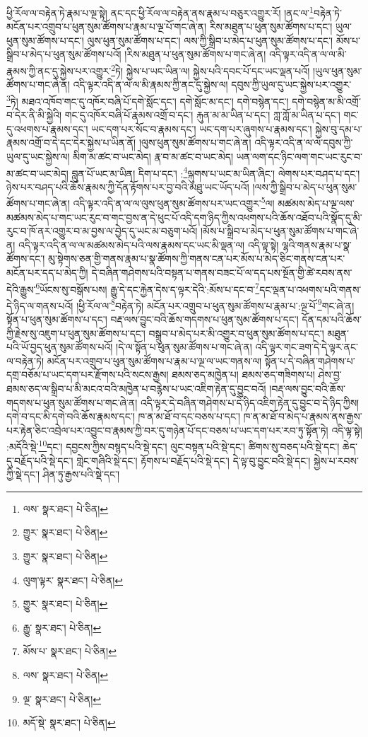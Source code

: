 ཕྱི་རོལ་ལ་བརྟེན་ཏེ་རྣམ་པ་ལྔ་སྟེ། ནང་དང་ཕྱི་རོལ་ལ་བརྟེན་ནས་རྣམ་པ་བཅུར་འགྱུར་རོ། །ནང་ལ་\footnote{ལས་  སྣར་ཐང་།  པེ་ཅིན། }བརྟེན་ཏེ་མངོན་པར་འགྲུབ་པ་ཕུན་སུམ་ཚོགས་པ་རྣམ་པ་ལྔ་པོ་གང་ཞེ་ན། རིས་མཐུན་པ་ཕུན་སུམ་ཚོགས་པ་དང་། ཡུལ་ཕུན་སུམ་ཚོགས་པ་དང་། ལུས་ཕུན་སུམ་ཚོགས་པ་དང་། ལས་ཀྱི་སྒྲིབ་པ་མེད་པ་ཕུན་སུམ་ཚོགས་པ་དང་། མོས་པ་སྒྲིབ་པ་མེད་པ་ཕུན་སུམ་ཚོགས་པའོ། །རིས་མཐུན་པ་ཕུན་སུམ་ཚོགས་པ་གང་ཞེ་ན། འདི་ལྟར་འདི་ན་ལ་ལ་མི་རྣམས་ཀྱི་ནང་དུ་སྐྱེས་པར་འགྱུར་\footnote{གྱུར་  སྣར་ཐང་།  པེ་ཅིན། }ཏེ། སྐྱེས་པ་ཡང་ཡིན་ལ། སྐྱེས་པའི་དབང་པོ་དང་ཡང་ལྡན་པའོ། །ཡུལ་ཕུན་སུམ་ཚོགས་པ་གང་ཞེ་ན། འདི་ལྟར་འདི་ན་ལ་ལ་མི་རྣམས་ཀྱི་ནང་དུ་སྐྱེས་ལ། དབུས་ཀྱི་ཡུལ་དུ་ཡང་སྐྱེས་པར་འགྱུར་\footnote{གྱུར་  སྣར་ཐང་།  པེ་ཅིན། }ཏེ། མཐའ་འཁོབ་གང་དུ་འཁོར་བཞི་པོ་དགེ་སློང་དང་། དགེ་སློང་མ་དང་། དགེ་བསྙེན་དང་། དགེ་བསྙེན་མ་མི་འགྲོ་བ་དེར་ནི་མི་སྐྱེའི། གང་དུ་འཁོར་བཞི་པོ་རྣམས་འགྲོ་བ་དང་། རྐུན་མ་མ་ཡིན་པ་དང་། ཀླ་ཀློ་མ་ཡིན་པ་དང་། གང་དུ་འཕགས་པ་རྣམས་དང་། ཡང་དག་པར་སོང་བ་རྣམས་དང་། ཡང་དག་པར་ཞུགས་པ་རྣམས་དང་། སྐྱེས་བུ་དམ་པ་རྣམས་འགྲོ་བ་དེ་དང་དེར་སྐྱེས་པ་ཡིན་ནོ། །ལུས་ཕུན་སུམ་ཚོགས་པ་གང་ཞེ་ན། འདི་ལྟར་འདི་ན་ལ་ལ་དབུས་ཀྱི་ཡུལ་དུ་ཡང་སྐྱེས་ལ། མིག་མ་ཚང་བ་ཡང་མེད། རྣ་བ་མ་ཚང་བ་ཡང་མེད། ཡན་ལག་དང་ཉིང་ལག་གང་ཡང་རུང་བ་མ་ཚང་བ་ཡང་མེད། བླུན་པོ་ཡང་མ་ཡིན། དིག་པ་དང་། :\footnote{ལུག་ལྟར་  སྣར་ཐང་།  པེ་ཅིན། }ལྐུགས་པ་ཡང་མ་ཡིན་ཞིང་། ལེགས་པར་བཤད་པ་དང་། ཉེས་པར་བཤད་པའི་ཆོས་རྣམས་ཀྱི་དོན་རྟོགས་པར་བྱ་བའི་མཐུ་ཡང་ཡོད་པའོ། །ལས་ཀྱི་སྒྲིབ་པ་མེད་པ་ཕུན་སུམ་ཚོགས་པ་གང་ཞེ་ན། འདི་ལྟར་འདི་ན་ལ་ལ་ལུས་ཕུན་སུམ་ཚོགས་པར་ཡང་འགྱུར་\footnote{གྱུར་  སྣར་ཐང་།  པེ་ཅིན། }ལ། མཚམས་མེད་པ་ལྔ་ལས་མཚམས་མེད་པ་གང་ཡང་རུང་བ་གང་བྱས་ན་དེ་ཕུང་པོ་འདི་དག་ཉིད་ཀྱིས་འཕགས་པའི་ཆོས་འཐོབ་པའི་སྣོད་དུ་མི་རུང་བ་ཁོ་ནར་འགྱུར་བ་མ་བྱས་ལ་བྱེད་དུ་ཡང་མ་བཅུག་པའོ། །མོས་པ་སྒྲིབ་པ་མེད་པ་ཕུན་སུམ་ཚོགས་པ་གང་ཞེ་ན། འདི་ལྟར་འདི་ན་ལ་ལ་མཚམས་མེད་པའི་ལས་རྣམས་དང་ཡང་མི་ལྡན་ལ། འདི་ལྟ་སྟེ། ལྷའི་གནས་རྣམ་པ་སྣ་ཚོགས་དང་། མུ་སྟེགས་ཅན་གྱི་གནས་རྣམ་པ་སྣ་ཚོགས་ཀྱི་གནས་ངན་པར་མོས་པ་མེད་ཅིང་གནས་ངན་པར་མངོན་པར་དད་པ་མེད་ཀྱི། དེ་བཞིན་གཤེགས་པའི་བསྟན་པ་གནས་བཟང་པོ་ལ་དད་པས་སྔོན་གྱི་ཚེ་རབས་ནས་དེའི་རྒྱུས་\footnote{རྒྱུ་  སྣར་ཐང་།  པེ་ཅིན། }ཡོངས་སུ་བསྒོས་པས། རྒྱུ་དེ་དང་རྐྱེན་དེས་ད་ལྟར་དེའི་:མོས་པ་དང་བ་\footnote{མོས་པ་  སྣར་ཐང་།  པེ་ཅིན། }དང་ལྡན་པ་འཕགས་པའི་གནས་དེ་ཉིད་ལ་གནས་པའོ། །ཕྱི་རོལ་ལ་\footnote{ལས་  སྣར་ཐང་།  པེ་ཅིན། }བརྟེན་ཏེ། མངོན་པར་འགྲུབ་པ་ཕུན་སུམ་ཚོགས་པ་རྣམ་པ་:ལྔ་པོ་\footnote{ལྔ་  སྣར་ཐང་།  པེ་ཅིན། }གང་ཞེ་ན། སྟོན་པ་ཕུན་སུམ་ཚོགས་པ་དང་། བརྡ་ལས་བྱུང་བའི་ཆོས་གདགས་པ་ཕུན་སུམ་ཚོགས་པ་དང་། དོན་དམ་པའི་ཆོས་ཀྱི་རྗེས་སུ་འཇུག་པ་ཕུན་སུམ་ཚོགས་པ་དང་། བསྒྲུབ་པ་མེད་པར་མི་འགྱུར་བ་ཕུན་སུམ་ཚོགས་པ་དང་། མཐུན་པའི་ཡོ་བྱད་ཕུན་སུམ་ཚོགས་པའོ། །དེ་ལ་སྟོན་པ་ཕུན་སུམ་ཚོགས་པ་གང་ཞེ་ན། འདི་ལྟར་གང་ཟག་དེ་དེ་ལྟར་ནང་ལ་བརྟེན་ཏེ། མངོན་པར་འགྲུབ་པ་ཕུན་སུམ་ཚོགས་པ་རྣམ་པ་ལྔ་ལ་ཡང་གནས་ལ། སྟོན་པ་དེ་བཞིན་གཤེགས་པ་དགྲ་བཅོམ་པ་ཡང་དག་པར་རྫོགས་པའི་སངས་རྒྱས། ཐམས་ཅད་མཁྱེན་པ། ཐམས་ཅད་གཟིགས་པ། ཤེས་བྱ་ཐམས་ཅད་ལ་སྒྲིབ་པ་མི་མངའ་བའི་མཁྱེན་པ་བརྙེས་པ་ཡང་འཇིག་རྟེན་དུ་བྱུང་བའོ། །བརྡ་ལས་བྱུང་བའི་ཆོས་གདགས་པ་ཕུན་སུམ་ཚོགས་པ་གང་ཞེ་ན། འདི་ལྟར་དེ་བཞིན་གཤེགས་པ་དེ་ཉིད་འཇིག་རྟེན་དུ་བྱུང་བ་དེ་ཉིད་ཀྱིས། དགེ་བ་དང་མི་དགེ་བའི་ཆོས་རྣམས་དང་། ཁ་ན་མ་ཐོ་བ་དང་བཅས་པ་དང་། ཁ་ན་མ་ཐོ་བ་མེད་པ་རྣམས་ནས་རྒྱས་པར་རྟེན་ཅིང་འབྲེལ་པར་འབྱུང་བ་རྣམས་ཀྱི་བར་དུ་གཉེན་པོ་དང་བཅས་པ་ཡང་དག་པར་རབ་ཏུ་སྟོན་ཏེ། འདི་ལྟ་སྟེ། :མདོའི་སྡེ་\footnote{མདོ་སྡེ་  སྣར་ཐང་།  པེ་ཅིན། }དང་། དབྱངས་ཀྱིས་བསྙད་པའི་སྡེ་དང་། ལུང་བསྟན་པའི་སྡེ་དང་། ཚིགས་སུ་བཅད་པའི་སྡེ་དང་། ཆེད་དུ་བརྗོད་པའི་སྡེ་དང་། གླེང་གཞིའི་སྡེ་དང་། རྟོགས་པ་བརྗོད་པའི་སྡེ་དང་། དེ་ལྟ་བུ་བྱུང་བའི་སྡེ་དང་། སྐྱེས་པ་རབས་ཀྱི་སྡེ་དང་། ཤིན་ཏུ་རྒྱས་པའི་སྡེ་དང་། 